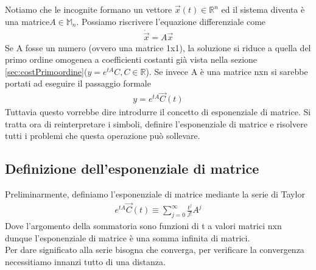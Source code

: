 \documentclass[10pt,a4paper]{article}
\begin{document}
Notiamo che le incognite formano un vettore \(\vec{x}(t)\in\mathbb{R}^n\) ed il sistema diventa è una matrice\(A\in \mathbb{M}_n\). Possiamo riscrivere l'equazione differenziale come
\begin{align*}
\dot{\vec{x}} = A \vec{x}
\end{align*}
Se A fosse un numero (ovvero una matrice 1x1), la soluzione si riduce a quella del primo ordine omogenea a coefficienti costanti già vista nella sezione \ref{sec:costPrimoordine}(\(y = e^{tA}C, C\in \mathbb{R}\)). Se invece A è una matrice nxn si sarebbe portati ad eseguire il passaggio formale
\begin{align*}
	y=e^{tA}\vec{C}(t)
\end{align*}
Tuttavia questo vorrebbe dire introdurre il concetto di esponenziale di matrice. Si tratta ora di reinterpretare i simboli, definire l'esponenziale di matrice e risolvere tutti i problemi che questa operazione può sollevare. 
\subsection{Definizione dell'esponenziale di matrice}
Preliminarmente, definiamo l'esponenziale di matrice mediante la serie di Taylor
\begin{align*}
	e^{tA}\vec{C}(t)\equiv\sum_{j=0}^{\infty}\frac{t^j}{j!}A^j
\end{align*}
Dove l'argomento della sommatoria sono funzioni di t a valori matrici nxn dunque l'esponenziale di matrice è una somma infinita di matrici.\\
Per dare significato alla serie bisogna che converga, per verificare la convergenza necessitiamo innanzi tutto di una distanza.
\end{document}
